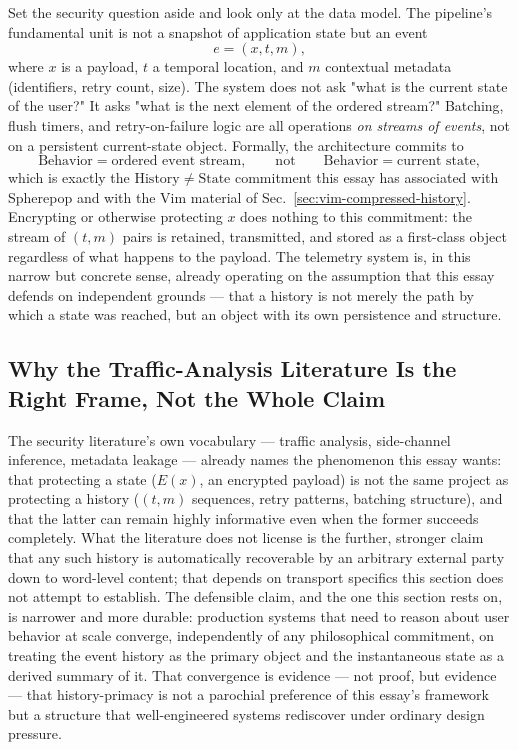 \documentclass[12pt,a4paper]{article}
\theoremstyle{plain}
\theoremstyle{definition}
\theoremstyle{remark}
\begin{document}
Set the security question aside and look only at the data model. The pipeline's fundamental unit is not a snapshot of application state but an event
\[
e = (x, t, m),
\]
where $x$ is a payload, $t$ a temporal location, and $m$ contextual metadata (identifiers, retry count, size). The system does not ask "what is the current state of the user?" It asks "what is the next element of the ordered stream?" Batching, flush timers, and retry-on-failure logic are all operations \emph{on streams of events}, not on a persistent current-state object. Formally, the architecture commits to
\[
\text{Behavior} = \text{ordered event stream}, \qquad \text{not} \qquad \text{Behavior} = \text{current state},
\]
which is exactly the $\mathrm{History} \neq \mathrm{State}$ commitment this essay has associated with Spherepop and with the Vim material of Sec.~\ref{sec:vim-compressed-history}. Encrypting or otherwise protecting $x$ does nothing to this commitment: the stream of $(t, m)$ pairs is retained, transmitted, and stored as a first-class object regardless of what happens to the payload. The telemetry system is, in this narrow but concrete sense, already operating on the assumption that this essay defends on independent grounds — that a history is not merely the path by which a state was reached, but an object with its own persistence and structure.

\subsection{Why the Traffic-Analysis Literature Is the Right Frame, Not the Whole Claim}
\label{subsec:telemetry-frame}

The security literature's own vocabulary — traffic analysis, side-channel inference, metadata leakage — already names the phenomenon this essay wants: that protecting a state ($E(x)$, an encrypted payload) is not the same project as protecting a history ($(t,m)$ sequences, retry patterns, batching structure), and that the latter can remain highly informative even when the former succeeds completely. What the literature does not license is the further, stronger claim that any such history is automatically recoverable by an arbitrary external party down to word-level content; that depends on transport specifics this section does not attempt to establish. The defensible claim, and the one this section rests on, is narrower and more durable: production systems that need to reason about user behavior at scale converge, independently of any philosophical commitment, on treating the event history as the primary object and the instantaneous state as a derived summary of it. That convergence is evidence — not proof, but evidence — that history-primacy is not a parochial preference of this essay's framework but a structure that well-engineered systems rediscover under ordinary design pressure.
\end{document}
